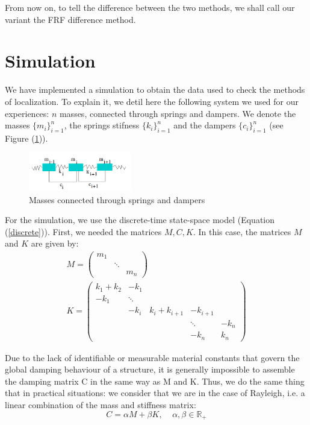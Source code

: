 \documentclass[journal]{IEEEtran}
\begin{document}
From now on, to tell the difference between the two methods, we shall call our variant the FRF difference method.



\section{Simulation}


We have implemented a simulation to obtain the data used to check the methods of localization. To explain it, we detil here the following system we used for our experiences: $n$ masses, connected
through springs and dampers. We denote the masses $\{m_i\}_{i=1}^n$, the springs stifness $\{k_i\}_{i=1}^n$ and the dampers $\{c_i\}_{i=1}^n$ (see Figure (\ref{springs})).

\begin{figure}[h!]
  \centering
  \includegraphics[width=0.4\textwidth]{images/ressorts.png}
  \caption{Masses connected through springs and dampers}
  \label{springs}
\end{figure}

For the simulation, we use the discrete-time state-space model (Equation (\ref{discrete})). First, we needed the matrices $M, C, K$. In this case, the matrices $M$ and $K$ are given by:
\begin{equation}
\begin{array}{l}
M = 
\begin{pmatrix} 
m_1\\ 
&\ddots\\ 
&&m_n
\end{pmatrix} 
\\
K = 
\begin{pmatrix} 
k_1 + k_2 & - k_1 \\ 
- k_1 &\ddots\\ 
& -k_i & k_i + k_{i+1} & -k_{i+1} \\
&&&\ddots& -k_n\\
&&& -k_n & k_n
\end{pmatrix} 
\end{array}
\end{equation}


Due to the lack of identifiable or measurable material
constants that govern the global damping behaviour of a structure, it is generally
impossible to assemble the damping matrix C in the same way as M and K.
Thus, we do the same thing that in practical situations: we consider that we are in the case of Rayleigh, i.e. a linear combination of the mass and stiffness matrix:
\begin{equation}
C = \alpha M + \beta K,\ \ \ \ \ \alpha, \beta \in \mathbb{R}_+
\end{equation}
\end{document}
